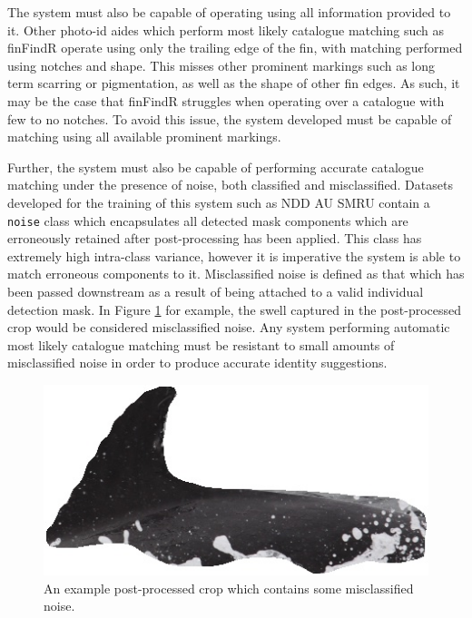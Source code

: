The system must also be capable of operating using all information provided to it. Other photo-id aides which perform most likely catalogue matching such as finFindR \cite{thompson_finfindr_2022} operate using only the trailing edge of the fin, with matching performed using notches and shape. This misses other prominent markings such as long term scarring or pigmentation, as well as the shape of other fin edges. As such, it may be the case that finFindR struggles when operating over a catalogue with few to no notches. To avoid this issue, the system developed must be capable of matching using all available prominent markings. 

Further, the system must also be capable of performing accurate catalogue matching under the presence of noise, both classified and misclassified. Datasets developed for the training of this system such as NDD AU SMRU contain a \texttt{noise} class which encapsulates all detected mask components which are erroneously retained after post-processing has been applied. This class has extremely high intra-class variance, however it is imperative the system is able to match erroneous components to it. Misclassified noise is defined as that which has been passed downstream as a result of being attached to a valid individual detection mask. In Figure \ref{fig:crop-with-unclassified-noise} for example, the swell captured in the post-processed crop would be considered misclassified noise. Any system performing automatic most likely catalogue matching must be resistant to small amounts of misclassified noise in order to produce accurate identity suggestions.

\begin{figure}
	\begin{center}
		\includegraphics[scale=0.6]{Chapter5/figs/crop-with-unclassified-noise.jpg}
	\end{center}
	\caption{An example post-processed crop which contains some misclassified noise.}
	\label{fig:crop-with-unclassified-noise}
\end{figure}

